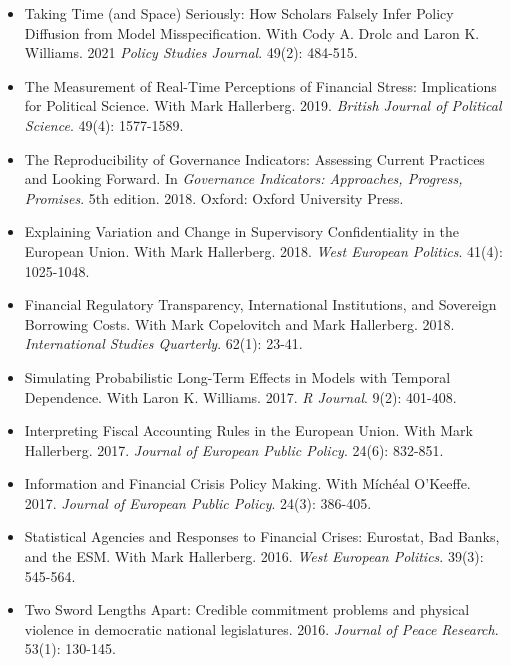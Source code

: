 \documentclass[a4paper]{article}
\begin{document}
\begin{itemize}

    \item Taking Time (and Space) Seriously: How Scholars Falsely Infer Policy Diffusion from Model Misspecification. With Cody A. Drolc and Laron K. Williams. 2021 \emph{Policy Studies Journal}. 49(2): 484-515.

    \item The Measurement of Real-Time Perceptions of Financial Stress: Implications for Political Science. With Mark Hallerberg. 2019. \emph{British Journal of Political Science}. 49(4): 1577-1589.

    \item The Reproducibility of Governance Indicators: Assessing Current Practices and Looking Forward. In \emph{Governance Indicators: Approaches, Progress, Promises}. 5th edition. 2018. Oxford: Oxford University Press.

    \item Explaining Variation and Change in Supervisory Confidentiality in the European Union. With Mark Hallerberg. 2018. \emph{West European Politics}. 41(4): 1025-1048.

    \item Financial Regulatory Transparency, International Institutions, and Sovereign Borrowing Costs. With Mark Copelovitch and Mark Hallerberg. 2018. \emph{International Studies Quarterly}. 62(1): 23-41.

    \item Simulating Probabilistic Long-Term Effects in Models with Temporal Dependence. With Laron K. Williams. 2017. \emph{R Journal}. 9(2): 401-408.

    \item Interpreting Fiscal Accounting Rules in the European Union. With Mark Hallerberg. 2017. \emph{Journal of European Public Policy}. 24(6): 832-851.

    \item Information and Financial Crisis Policy Making. With M\'{i}ch\'{e}al O'Keeffe. 2017. \emph{Journal of European Public Policy}. 24(3): 386-405.

    \item Statistical Agencies and Responses to Financial Crises: Eurostat, Bad Banks, and the ESM. With Mark Hallerberg. 2016. {\emph{West European Politics}}. 39(3): 545-564.

    \item Two Sword Lengths Apart: Credible commitment problems and physical violence in democratic national legislatures. 2016. \emph{Journal of Peace Research}. 53(1): 130-145.


\end{itemize}
\end{document}
